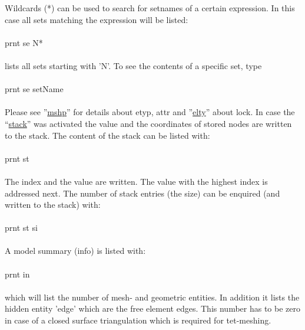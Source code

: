 \documentclass{article}
\providecommand{\htmlref}[2]{\hyperref[#2]{#1}}
\begin{document}
Wildcards (*) can be used to search for setnames of a certain expression. In this case all sets matching the expression will be listed:\\\\prnt se N*\\\\lists all sets starting with 'N'. To see the contents of a specific set, type\\\\prnt se setName\\\\Please see ''\htmlref{mshp}{mshp}'' for details about etyp, attr and ''\htmlref{elty}{elty}'' about lock. In case the ``\htmlref{stack}{stack}'' was activated the value and the coordinates of stored nodes are written to the stack. The content of the stack can be listed with:\\\\prnt st\\\\The index and the value are written. The value with the highest index is addressed next. The number of stack entries (the size) can be enquired (and written to the stack) with:\\\\prnt st si\\\\A model summary (info) is listed with:\\\\prnt in\\\\which will list the number of mesh- and geometric entities. In addition it lists the hidden entity 'edge' which are the free element edges. This number has to be zero in case of a closed surface triangulation which is required for tet-meshing.
\end{document}
